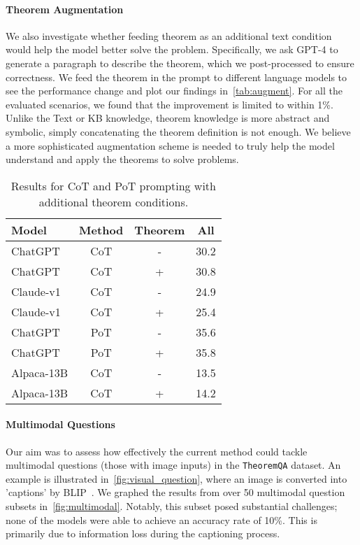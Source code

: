 \documentclass[11pt]{article}
\newcommand{\dataset}{\texttt{TheoremQA}\xspace}
\begin{document}
\paragraph{Theorem Augmentation}
We also investigate whether feeding theorem as an additional text condition would help the model better solve the problem. Specifically, we ask GPT-4 to generate a paragraph to describe the theorem, which we post-processed to ensure correctness. We feed the theorem in the prompt to different language models to see the performance change and plot our findings in~\autoref{tab:augment}. For all the evaluated scenarios, we found that the improvement is limited to within 1\%. Unlike the Text or KB knowledge, theorem knowledge is more abstract and symbolic, simply concatenating the theorem definition is not enough. We believe a more sophisticated augmentation scheme is needed to truly help the model understand and apply the theorems to solve problems.
\begin{table}[!h]
\centering
\small
\begin{tabular}{l|ccc}
\toprule
Model      &  Method  &  Theorem  &  All \\
\midrule
ChatGPT    &  CoT     &  -        &  30.2 \\
ChatGPT    &  CoT     &  +        &  30.8 \\
\midrule
Claude-v1   &  CoT    &  -       &  24.9 \\
Claude-v1   &  CoT    &  +       &  25.4 \\
\midrule
ChatGPT    &  PoT     &  -        &  35.6 \\
ChatGPT    &  PoT     &  +        &  35.8 \\
\midrule
Alpaca-13B &  CoT     &  -        &  13.5 \\
Alpaca-13B &  CoT     &  +        &  14.2 \\
\bottomrule
\end{tabular}
\caption{Results for CoT and PoT prompting with additional theorem conditions.}
\label{tab:augment}
\end{table}

\paragraph{Multimodal Questions}
Our aim was to assess how effectively the current method could tackle multimodal questions (those with image inputs) in the \dataset dataset. An example is illustrated in~\autoref{fig:visual_question}, where an image is converted into 'captions' by BLIP~\cite{li2022blip}. We graphed the results from over 50 multimodal question subsets in~\autoref{fig:multimodal}. Notably, this subset posed substantial challenges; none of the models were able to achieve an accuracy rate of 10\%. This is primarily due to information loss during the captioning process.
\end{document}
